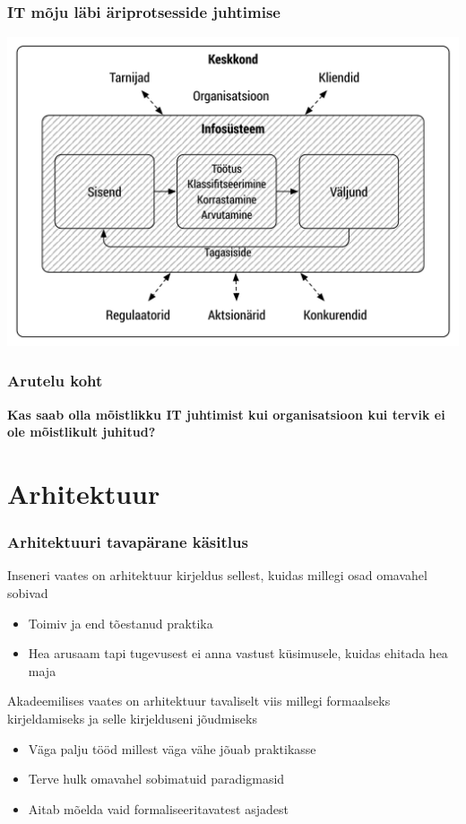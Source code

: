\begin{frame}[fragile]
  \frametitle{IT mõju läbi äriprotsesside juhtimise}
		\begin{center}
			\includegraphics[width=.80\textwidth]{info_org.pdf}\\
		\end{center}
		\cite{laudon2000management}
\end{frame}


\begin{frame}[fragile]
  \frametitle{Arutelu koht}
		\begin{center}
			\textbf{Kas saab olla mõistlikku IT juhtimist kui organisatsioon kui tervik ei ole mõistlikult juhitud?}
		\end{center}
\end{frame}

\section{Arhitektuur}

\begin{frame}[fragile]
  \frametitle{Arhitektuuri tavapärane käsitlus}
		Inseneri vaates on arhitektuur kirjeldus sellest, kuidas millegi osad omavahel sobivad
		\begin{itemize}
			\item Toimiv ja end tõestanud praktika
			\item Hea arusaam tapi tugevusest ei anna vastust küsimusele, kuidas ehitada hea maja
		\end{itemize}
		
		Akadeemilises vaates on arhitektuur tavaliselt viis millegi formaalseks kirjeldamiseks ja selle kirjelduseni jõudmiseks
		\begin{itemize}
			\item Väga palju tööd millest väga vähe jõuab praktikasse
			\item Terve hulk omavahel sobimatuid paradigmasid
			\item Aitab mõelda vaid formaliseeritavatest asjadest
		\end{itemize}
		
\end{frame}

